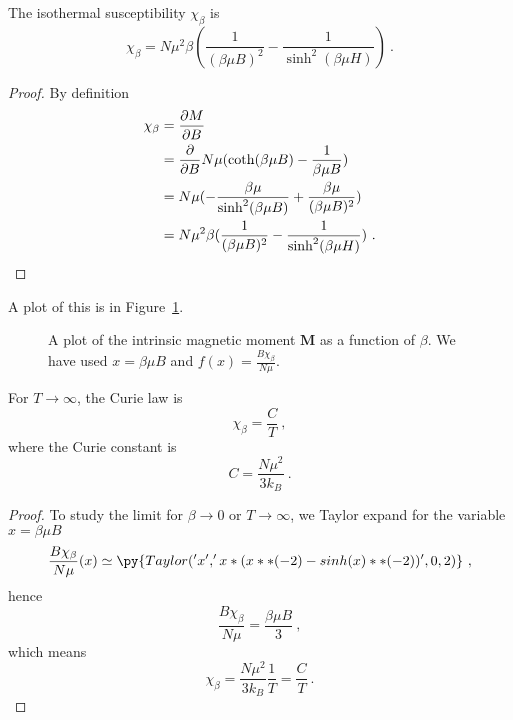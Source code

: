     The isothermal susceptibility $\chi_\beta$ is 
    \begin{equation*}
        \chi_\beta = N \mu^2 \beta ( \frac{1}{(\beta \mu B)^2} - \frac{1}{\sinh^2 (\beta \mu H)}) ~.
    \end{equation*}
    \begin{proof}
        By definition
        \begin{equation*}
        \begin{aligned}
            \chi_\beta & = \frac{\partial M}{\partial B} \\ & = \frac{\partial}{\partial B} N\mu (\coth(\beta \mu B) - \frac{1}{\beta \mu B}) \\ & = N \mu ( - \frac{\beta \mu}{\sinh^2 (\beta \mu B)} + \frac{\beta \mu}{(\beta \mu B)^2} ) \\ & = N \mu^2 \beta ( \frac{1}{(\beta \mu B)^2} - \frac{1}{\sinh^2 (\beta \mu H)}) ~.
        \end{aligned}
        \end{equation*}
    \end{proof}
    A plot of this is in Figure~\ref{can:sus}.
    \begin{figure}
        \centering
        \caption{A plot of the intrinsic magnetic moment $\mathbf M$ as a function of $\beta$. We have used $x = \beta \mu B$ and $f(x) = \frac{B \chi_\beta}{N \mu}$.}
        \label{can:sus}
    \end{figure}

    For $T \rightarrow \infty$, the Curie law is 
    \begin{equation*}
        \chi_\beta = \frac{C}{T} ~,
    \end{equation*}
    where the Curie constant is 
    \begin{equation*}
        C = \frac{N \mu^2}{3 k_B} ~.
    \end{equation*}
    \begin{proof}
        To study the limit for $\beta \rightarrow 0$ or $T \rightarrow \infty$, we Taylor expand for the variable $x = \beta \mu B$
        \begin{equation*}
            \frac{B \chi_\beta}{N \mu} (x) \simeq \py{Taylor('x', 'x * ( x**(-2) - sinh(x)**(-2))', 0, 2)} ~,
        \end{equation*}
        hence 
        \begin{equation*}
            \frac{B \chi_\beta}{N \mu} = \frac{\beta \mu B}{3} ~,
        \end{equation*}
        which means 
        \begin{equation*}
            \chi_\beta = \frac{N \mu^2}{3 k_B} \frac{1}{T} = \frac{C}{T} ~.
        \end{equation*}
    \end{proof}

